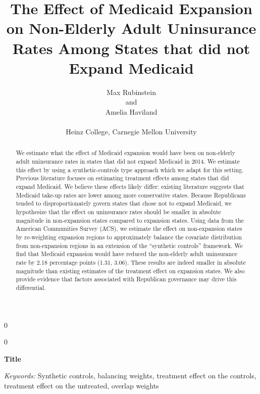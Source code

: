\documentclass[12pt]{article}
\newcommand{\blind}{0}
\begin{document}
\blind
{
  \title{\bf The Effect of Medicaid Expansion on Non-Elderly Adult Uninsurance Rates Among States that did not Expand Medicaid}
  \author{Max Rubinstein \hspace{.2cm}\\
    and \\
    Amelia Haviland \\ \\
    Heinz College, Carnegie Mellon University}
  \maketitle
} \fi

\blind
{
  \bigskip
  \bigskip
  \bigskip
  \begin{center}
    {\LARGE\bf Title}
\end{center}
  \medskip
} \fi

\bigskip

\begin{abstract}

We estimate what the effect of Medicaid expansion would have been on non-elderly adult uninsurance rates in states that did not expand Medicaid in 2014. We estimate this effect by using a synthetic-controls type approach which we adapt for this setting. Previous literature focuses on estimating treatment effects among states that did expand Medicaid. We believe these effects likely differ: existing literature suggests that Medicaid take-up rates are lower among more conservative states. Because Republicans tended to disproportionately govern states that chose not to expand Medicaid, we hypothesize that the effect on uninsurance rates should be smaller in absolute magnitude in non-expansion states compared to expansion states. Using data from the American Communities Survey (ACS), we estimate the effect on non-expansion states by re-weighting expansion regions to approximately balance the covariate distribution from non-expansion regions in an extension of the ``synthetic controls'' framework. We find that Medicaid expansion would have reduced the non-elderly adult uninsurance rate by 2.18 percentage points (1.31, 3.06). These results are indeed smaller in absolute magnitude than existing estimates of the treatment effect on expansion states. We also provide evidence that factors associated with Republican governance may drive this differential.

\end{abstract}

\noindent%
{\it Keywords:} Synthetic controls, balancing weights, treatment effect on the controls, treatment effect on the untreated, overlap weights
\vfill
\end{document}
